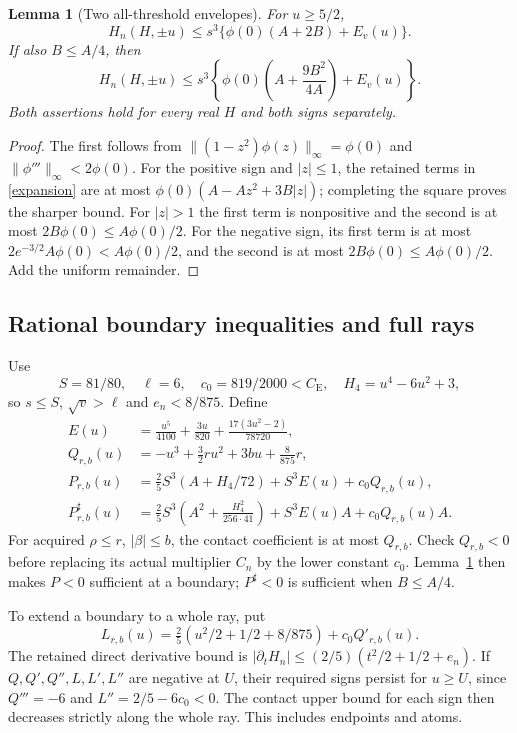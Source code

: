\documentclass[11pt]{article}
\newtheorem{lemma}{Lemma}
\newcommand{\CE}{C_{\mathrm E}}
\begin{document}
\begin{lemma}[Two all-threshold envelopes]\label{envelopes}
For $u\ge5/2$,
\[
 H_n(H,\pm u)\le s^3\{\phi(0)(A+2B)+E_v(u)\}.
\]
If also $B\le A/4$, then
\[
 H_n(H,\pm u)\le
 s^3\left\{\phi(0)\left(A+\frac{9B^2}{4A}\right)+E_v(u)\right\}.
\]
Both assertions hold for every real $H$ and both signs separately.
\end{lemma}
\begin{proof}
The first follows from
$\|(1-z^2)\phi(z)\|_\infty=\phi(0)$ and
$\|\phi'''\|_\infty<2\phi(0)$.
For the positive sign and $|z|\le1$, the retained terms in
\eqref{expansion} are at most
$\phi(0)(A-Az^2+3B|z|)$; completing the square proves the sharper bound.
For $|z|>1$ the first term is nonpositive and the second is at most
$2B\phi(0)\le A\phi(0)/2$.
For the negative sign, its first term is at most
$2e^{-3/2}A\phi(0)<A\phi(0)/2$, and the second is at most
$2B\phi(0)\le A\phi(0)/2$. Add the uniform remainder.
\end{proof}

\subsection{Rational boundary inequalities and full rays}
Use
\[
 S=81/80,\quad \ell=6,\quad c_0=819/2000<\CE,\quad
 H_4=u^4-6u^2+3,
\]
so $s\le S$, $\sqrt v>\ell$ and $e_n<8/875$. Define
\begin{align*}
 E(u)&=\frac{u^5}{4100}+\frac{3u}{820}
                   +\frac{17(3u^2-2)}{78720},\\
 Q_{r,b}(u)&=-u^3+\tfrac32ru^2+3bu+\tfrac8{875}r,\\
 P_{r,b}(u)&=\tfrac25S^3(A+H_4/72)+S^3E(u)+c_0Q_{r,b}(u),\\
 P^\sharp_{r,b}(u)&=\tfrac25S^3
       \left(A^2+\frac{H_4^2}{256\cdot41}\right)
       +S^3E(u)A+c_0Q_{r,b}(u)A.
\end{align*}
For acquired $\rho\le r$, $|\beta|\le b$, the contact coefficient is at
most $Q_{r,b}$. Check $Q_{r,b}<0$ before replacing its actual multiplier
$C_n$ by the lower constant $c_0$. Lemma~\ref{envelopes} then makes
$P<0$ sufficient at a boundary; $P^\sharp<0$ is sufficient when $B\le A/4$.

To extend a boundary to a whole ray, put
\[
 L_{r,b}(u)=\tfrac25(u^2/2+1/2+8/875)+c_0Q'_{r,b}(u).
\]
The retained direct derivative bound is
$|\partial_tH_n|\le(2/5)(t^2/2+1/2+e_n)$.
If $Q,Q',Q'',L,L',L''$ are negative at $U$, their required signs persist
for $u\ge U$, since $Q'''=-6$ and $L''=2/5-6c_0<0$.
The contact upper bound for each sign then decreases strictly along the
whole ray. This includes endpoints and atoms.
\end{document}
